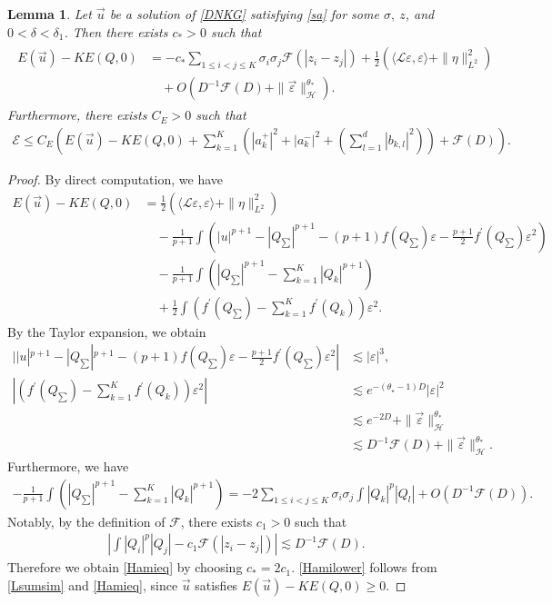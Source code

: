 \documentclass[reqno]{amsart}
\theoremstyle{plain}
\newtheorem{lemma}[theorem]{Lemma}
\theoremstyle{definition}
\numberwithin{equation}{section}
\newcommand{\1}{\mathbbm{1}}
\begin{document}
\begin{lemma}\label{Hamilem}
Let $\vec{u}$ be a solution of \eqref{DNKG} satisfying \eqref{sa} for some $\sigma,\ z$, and $0<\delta<\delta_1$. Then there exists $c_{\ast}>0$ such that
\begin{align}\label{Hamieq}
\begin{aligned}
E(\vec{u})-KE(Q,0)&=-c_{\ast}\sum_{1\leq i<j\leq K}\sigma_i\sigma_j\mathcal{F}(|z_i-z_j|)+\frac{1}{2}(\langle \mathcal{L}\varepsilon,\varepsilon\rangle+\|\eta\|_{L^2}^2)
\\
&\quad+O(D^{-1}\mathcal{F}(D)+\|\vec{\varepsilon}\|_{\mathcal{H}}^{\theta_{\ast}}).
\end{aligned}
\end{align}
Furthermore, there exists $C_E>0$ such that
\begin{align}\label{Hamilower}
\mathcal{E}\leq C_E\left(E(\vec{u})-KE(Q,0)+\sum_{k=1}^K\left( |a_k^+|^2+|a_k^-|^2+(\sum_{l=1}^d|b_{k,l}|^2)\right)+\mathcal{F}(D)\right).
\end{align}
\end{lemma}
\begin{proof}
By direct computation, we have
\begin{align*}
E(\vec{u})-KE(Q,0)&=\frac{1}{2}(\langle \mathcal{L}\varepsilon,\varepsilon\rangle+\|\eta\|_{L^2}^2)
\\
&\quad-\frac{1}{p+1}\int \left(|u|^{p+1}-|Q_{\sum}|^{p+1}-(p+1)f(Q_{\sum})\varepsilon-\frac{p+1}{2}f^{\prime}(Q_{\sum})\varepsilon^2\right)
\\
&\quad -\frac{1}{p+1}\int\left( |Q_{\sum}|^{p+1}-\sum_{k=1}^K |Q_k|^{p+1}\right)
\\
&\quad+\frac{1}{2}\int \left( f^{\prime}(Q_{\sum})-\sum_{k=1}^Kf^{\prime}(Q_k) \right)\varepsilon^2.
\end{align*}
By the Taylor expansion, we obtain
\begin{align*}
||u|^{p+1}-|Q_{\sum}|^{p+1}-(p+1)f(Q_{\sum})\varepsilon-\frac{p+1}{2}f^{\prime}(Q_{\sum})\varepsilon^2|&\lesssim |\varepsilon|^3,
\\
\left|\left( f^{\prime}(Q_{\sum})-\sum_{k=1}^Kf^{\prime}(Q_k) \right)\varepsilon^2\right|&\lesssim e^{-(\theta_{\star}-1) D}|\varepsilon|^2
\\
&\lesssim e^{-2D}+\|\vec{\varepsilon}\|_{\mathcal{H}}^{\theta_{\ast}}
\\
&\lesssim D^{-1}\mathcal{F}(D)+\|\vec{\varepsilon}\|_{\mathcal{H}}^{\theta_{\ast}}.
\end{align*}
Furthermore, we have
\begin{align*}
-\frac{1}{p+1}\int\left( |Q_{\sum}|^{p+1}-\sum_{k=1}^K |Q_k|^{p+1}\right)=-2\sum_{1\leq i<j\leq K}\sigma_i\sigma_j\int |Q_k|^p|Q_l|+O\left(D^{-1}\mathcal{F}(D) \right).
\end{align*}
Notably, by the definition of $\mathcal{F}$, there exists $c_1>0$ such that 
\begin{align*}
\left|\int |Q_i|^p|Q_j|-c_1\mathcal{F}(|z_i-z_j|)\right|\lesssim D^{-1}\mathcal{F}(D).
\end{align*}
Therefore we obtain \eqref{Hamieq} by choosing $c_{\ast}=2c_1$. \eqref{Hamilower} follows from \eqref{Lsumsim} and \eqref{Hamieq}, since $\vec{u}$ satisfies $E(\vec{u})-KE(Q,0)\geq 0$.
\end{proof}
\end{document}
